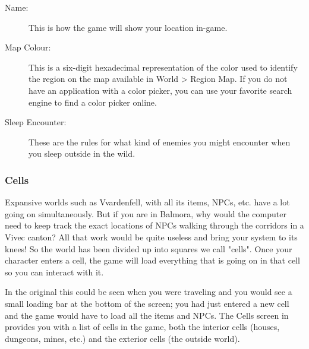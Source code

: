 \begin{description}
 \item[Name:] This is how the game will show your location in-game.
 \item[Map Colour:] This is a six-digit hexadecimal representation of the color used to identify the region on the map available in
 World > Region Map. If you do not have an application with a color picker, you can use your favorite search engine to find a color picker online.
 \item[Sleep Encounter:] These are the rules for what kind of enemies you might encounter when you sleep outside in the wild.
\end{description}

\subsubsection{Cells}
Expansive worlds such as Vvardenfell, with all its items, NPCs, etc. have a lot going on simultaneously. But if you are in Balmora,
why would the computer need to keep track the exact locations of NPCs walking through the corridors in a Vivec canton? All that work would
be quite useless and bring your system to its knees! So the world has been divided up into squares we call "cells". Once your character enters a cell,
the game will load everything that is going on in that cell so you can interact with it.

In the original \MW{} this could be seen when you were traveling and you would see a small loading bar at the bottom of the screen;
you had just entered a new cell and the game would have to load all the items and NPCs. The Cells screen in \OCS{} provides you with a list of cells
in the game, both the interior cells (houses, dungeons, mines, etc.) and the exterior cells (the outside world).

